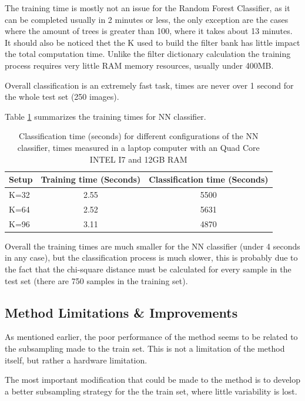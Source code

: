 \documentclass[10pt,twocolumn,letterpaper]{article}
\begin{document}
The training time is mostly not an issue for the Random Forest Classifier, as it can be completed usually in 2 minutes or less, the only exception are the cases where the amount of trees is greater than 100, where it takes about 13 minutes. It should also be noticed thet the K used to build the filter bank has little impact the total computation time. Unlike the filter dictionary calculation the training process requires very little RAM memory resources, usually under 400MB.


Overall classification is an extremely fast task, times are never over 1 second for the whole test set (250 images).


Table \ref{table:timesNN} summarizes the training times for NN classifier.

\begin{table}[t]
\centering
\begin{tabular}{ l | c | c  }
Setup & Training time (Seconds) & Classification time (Seconds)    \\
\hline	
K=32 & 2.55& 5500 \\
K=64 & 2.52 & 5631  \\
K=96 & 3.11 &  4870 \\

\end{tabular}
\caption{Classification time (seconds) for different configurations of the NN classifier, times measured in a laptop computer with an Quad Core INTEL I7 and 12GB RAM}
\label{table:timesNN}
\end{table}

Overall the training times are much smaller for the NN classifier (under 4 seconds in any case), but the classification process is much slower, this is probably due to the fact that the chi-square distance must be calculated for every sample in the test set (there are 750 samples in the training set).

\subsection{Method Limitations \& Improvements}
As mentioned earlier, the poor performance of the method seems to be related to the subsampling made to the train set. This is not a limitation of the method itself, but rather a hardware limitation.

The most important modification that could be made to the method is to develop a better  subsampling strategy for the the train set, where little  variability is lost.
\end{document}
